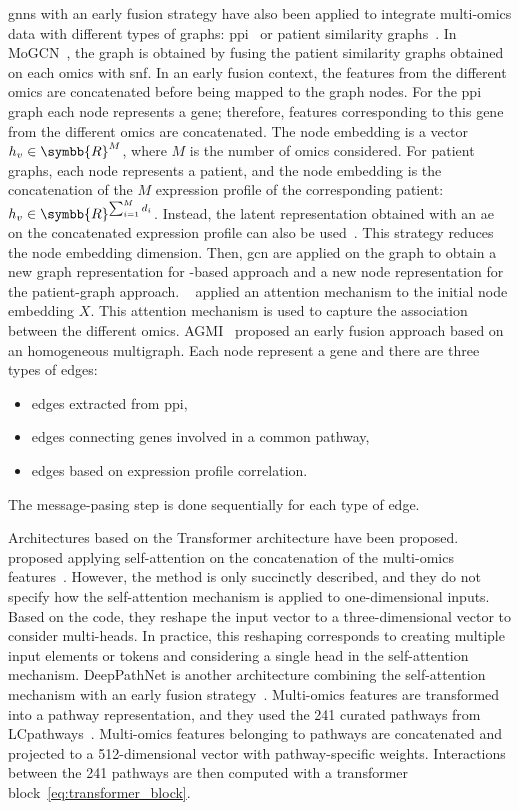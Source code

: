 \documentclass[../main.tex]{subfiles}
\begin{document}
			\Glspl{gnn} with an early fusion strategy have also been applied to integrate multi-omics data with different types of graphs: \gls{ppi}~\cite{Althubaiti_2021,Guo2023} or patient similarity graphs~\cite{MoGCN}.
			In MoGCN~\cite{MoGCN}, the graph is obtained by fusing the patient similarity graphs obtained on each omics with \gls{snf}.
			In an early fusion context, the features from the different omics are concatenated before being mapped to the graph nodes.
			For the \gls{ppi} graph each node represents a gene; therefore, features corresponding to this gene from the different omics are concatenated.
			The node embedding is a vector \(h_{v} \in \symbb{R}^{M}\), where \(M\) is the number of omics considered.
			For patient graphs, each node represents a patient, and the node embedding is the concatenation of the \(M\) expression profile of the corresponding patient: \(h_{v} \in \symbb{R}^{\sum_{i=1}^{M}d_i}\).
			Instead, the latent representation obtained with an \gls{ae} on the concatenated expression profile can also be used~\cite{MoGCN}.
			This strategy reduces the node embedding dimension.
			Then, \gls{gcn} are applied on the graph to obtain a new graph representation for -based approach and a new node representation for the patient-graph approach.
			\citeauthor{Guo2023}~\cite{Guo2023} applied an attention mechanism to the initial node embedding \(X\).
			This attention mechanism is used to capture the association between the different omics.
			AGMI~\cite{AGMI} proposed an early fusion approach based on an homogeneous multigraph. 
			Each node represent a gene and there are three types of edges: 
			\begin{itemize}[nosep]
				\item edges extracted from \gls{ppi},
				\item edges connecting genes involved in a common pathway,
				\item edges based on expression profile correlation. 
			\end{itemize}
			The message-pasing step is done sequentially for each type of edge.

			Architectures based on the Transformer architecture have been proposed.
			\citeauthor{SubtypeFormer} proposed applying self-attention on the concatenation of the multi-omics features~\cite{SubtypeFormer}.
			However, the method is only succinctly described, and they do not specify how the self-attention mechanism is applied to one-dimensional inputs.
			Based on the code, they reshape the input vector to a three-dimensional vector to consider multi-heads.
			In practice, this reshaping corresponds to creating multiple input elements or tokens and considering a single head in the self-attention mechanism.
			DeepPathNet is another architecture combining the self-attention mechanism with an early fusion strategy~\cite{DeepPathNet}.
			Multi-omics features are transformed into a pathway representation, and they used the 241 curated pathways from LCpathways~\cite{LCpathways}.
			Multi-omics features belonging to pathways are concatenated and projected to a 512-dimensional vector with pathway-specific weights.
			Interactions between the 241 pathways are then computed with a transformer block~\cref{eq:transformer_block}.
\end{document}
